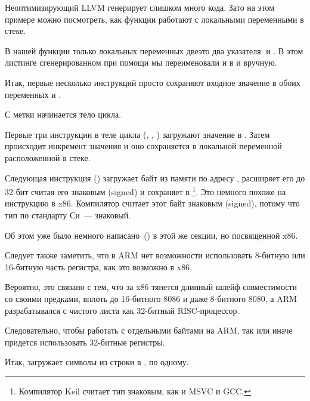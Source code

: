 ﻿

\myparagraphold{\NonOptimizingXcodeIV (\ARMMode)}



Неоптимизирующий LLVM генерирует слишком много кода. Зато на этом примере можно посмотреть, 
как функции работают с локальными переменными в стеке.

В нашей функции только локальных переменных две\EMDASH{}это два указателя:
 и .
В этом листинге сгенерированном при помощи \IDA мы переименовали  и  в  и  вручную.%

Итак, первые несколько инструкций просто сохраняют входное значение в обоих переменных  и .

С метки  начинается тело цикла.

Первые три инструкции в теле цикла (, \ADD, ) 
загружают значение  в . 
Затем происходит инкремент значения и оно сохраняется в локальной переменной  расположенной 
в стеке.

Следующая инструкция  () 
загружает байт из памяти по адресу , расширяет его до 32-бит считая его знаковым (signed) 
и сохраняет в 
\footnote{Компилятор Keil считает тип \Tchar знаковым, как и MSVC и GCC.}.
Это немного похоже на инструкцию \MOVSX в x86.
Компилятор считает этот байт знаковым (signed), потому что тип \Tchar по стандарту Си~--- знаковый.

Об этом уже было немного написано~() в этой же секции, но посвященной x86.

Следует также заметить, что в ARM нет возможности использовать 8-битную или 16-битную часть 
регистра, как это возможно в x86.

Вероятно, это связано с тем, что за x86 тянется длинный шлейф совместимости со своими предками, 
вплоть до 16-битного 8086 и даже 8-битного 8080, 
а ARM разрабатывался с чистого листа как 32-битный RISC-процессор.

Следовательно, чтобы работать с отдельными байтами на ARM, так или иначе придется использовать 
32-битные регистры.

Итак,  загружает символы из строки в , по одному.


